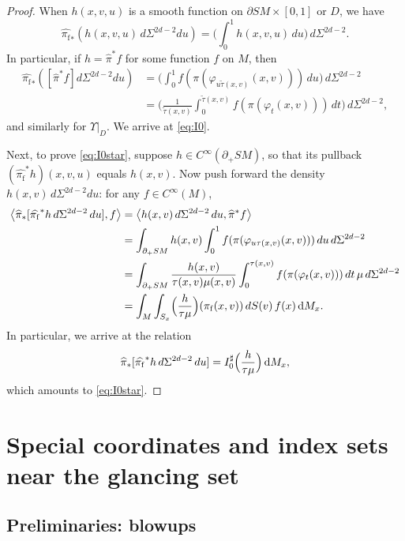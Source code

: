 \documentclass[JEP,XML,SOM,Unicode,NoFloatCountersInSection, NoEqCountersInSection,published]{cedram}
\theoremstyle{plain}
\theoremstyle{definition}
\theoremstyle{remark}
\newcommand{\adj}{I_0^\sharp}
\newcommand{\hpi}{\widehat{\pi}}
\newcommand {\dM}{\mathrm{d}M}
\newcommand{\foot}{{\pi_{\mathrm f}}}
\newcommand{\hF}{\widehat{\foot}}
\begin{document}
\begin{proof}
When $h(x,v,u)$ is a smooth function on $\partial SM \times [0,1]$ or $D$, we have
\begin{equation*}
\hF_* (h(x,v,u)\, d\Sigma^{2d-2} du) = \biggl(\int_0^1 h(x,v,u)\, du \biggr)\,d\Sigma^{2d-2}.
\end{equation*}
In particular, if $h = \hpi^* f$ for some function $f$ on $M$, then
\begin{equation*}%
\begin{aligned}
\hF_* \left([\hpi^* f]d\Sigma^{2d-2} du \right) &= \biggl(\int_0^1 f(\pi(\varphi_{u\tilde \tau(x,v)}(x,v)))\,du\biggr)\,d\Sigma^{2d-2} \\
&= \biggl(\frac{1}{\tilde\tau(x,v)} \int_0^{\tilde \tau(x,v)} f(\pi(\varphi_t(x,v)))\,dt\biggr)\,d\Sigma^{2d-2},
\end{aligned}
\end{equation*}
and similarly for $\Upsilon|_D$. We arrive at \eqref{eq:I0}.

Next, to prove \eqref{eq:I0star}, suppose $h \in C^\infty(\partial_+ SM)$, so that its pullback $(\hF^* h)(x,v,u)$ equals $h(x,v)$.
Now push forward the density $h(x,v)\,d\Sigma^{2d-2} du$: for any $f\in C^\infty(M)$,
\begin{align*}
\left\langle \hpi_* [\hF^* h\,d\Sigma^{2d-2}\,du], f \right\rangle &= \left\langle h(x,v)\,d\Sigma^{2d-2}\,du, \hpi^* f\right\rangle \\
&= \int_{\partial_+ SM} h(x,v) \int_0^1 f(\pi(\varphi_{u\tau(x,v)}(x,v)))\,du\,d\Sigma^{2d-2} \\
&= \int_{\partial_+ SM} \frac{h(x,v)}{\tau(x,v) \mu(x,v)} \int_{0}^{\tau(x,v)} f(\pi(\varphi_t(x,v)))\,dt\,\mu\,d\Sigma^{2d-2} \\
&= \int_M \int_{S_x} \Bigl(\frac{h}{\tau\mu}\Bigr)(\foot(x,v))\,dS(v)\,f(x)\,\dM_x.
\end{align*}
In particular, we arrive at the relation
\begin{equation*}
\hpi_* [\hF^* h\,d\Sigma^{2d-2}\,du] = \adj \Bigl(\frac{h}{\tau\mu} \Bigr)\,\dM_x,
\end{equation*}
which amounts to \eqref{eq:I0star}.
\end{proof}

\section{Special coordinates and index sets near the glancing set}

\subsection{Preliminaries: blowups} \label{sec:blowup}
\end{document}

